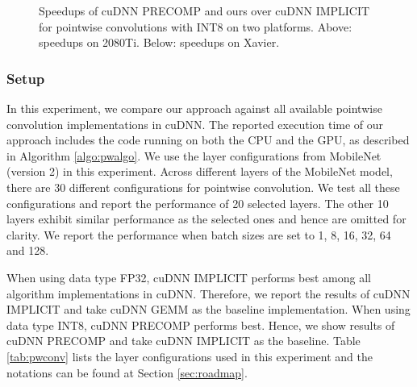 \begin{figure}
\captionsetup[subfloat]{labelformat=empty,skip=0pt}

	\centering
	\vspace{-5mm}
	\vspace{-6mm}
	\caption{Speedups of cuDNN PRECOMP and ours over cuDNN IMPLICIT for pointwise convolutions with INT8 on two platforms. Above: speedups on 2080Ti. Below: speedups on Xavier.}
	\label{fig:pwspeedupint8}
\end{figure}


\subsubsection{Setup} In this experiment, we compare our approach against all available pointwise convolution implementations in cuDNN.
The reported execution time of our approach includes the code running on both the CPU and the GPU, as described in Algorithm
\ref{algo:pwalgo}. We use the layer configurations from MobileNet (version 2) in this experiment. Across different layers of the MobileNet
model, there are 30 different configurations for pointwise convolution. We test all these configurations and report the performance of 20
selected layers. The other 10 layers exhibit similar performance as the selected ones and hence are omitted for clarity. We report the
performance when batch sizes are set to 1, 8, 16, 32, 64 and 128.

When using data type FP32, cuDNN IMPLICIT performs best among all algorithm implementations in cuDNN. Therefore, we report the results of
cuDNN IMPLICIT and take cuDNN GEMM as the baseline implementation. When using data type INT8, cuDNN PRECOMP performs best. Hence, we show
results of cuDNN PRECOMP and take cuDNN IMPLICIT as the baseline. Table \ref{tab:pwconv} lists the layer configurations used in this
experiment and  the notations can be found at Section \ref{sec:roadmap}.

